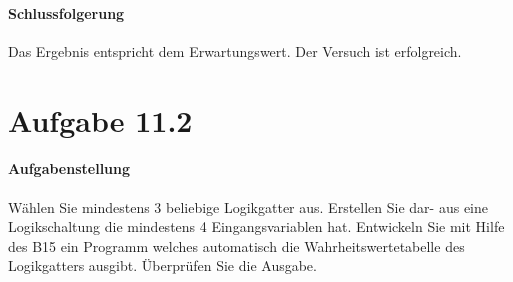 \paragraph{Schlussfolgerung}
Das Ergebnis entspricht dem Erwartungswert. Der Versuch ist erfolgreich.

\newpage
\section{Aufgabe 11.2}

\paragraph{Aufgabenstellung}
Wählen Sie mindestens 3 beliebige Logikgatter aus. Erstellen Sie dar- aus eine Logikschaltung die mindestens 4 Eingangsvariablen hat. Entwickeln Sie mit Hilfe des B15 ein Programm welches automatisch die Wahrheitswertetabelle des Logikgatters ausgibt. Überprüfen Sie die Ausgabe.

